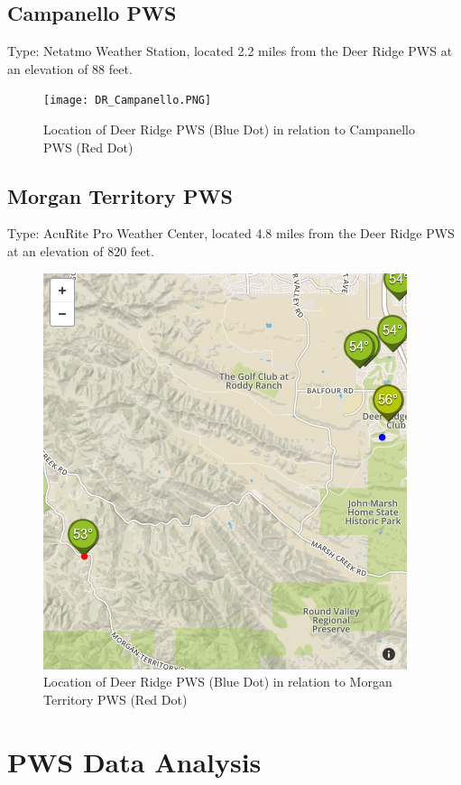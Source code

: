 \documentclass[sigconf]{acmart}
\begin{document}
\subsection{Campanello PWS}

Type: Netatmo Weather Station, located 2.2 miles from the Deer Ridge PWS at an elevation of 88 feet.

\begin{figure}[H]
    \centering
    \texttt{[image: DR\_Campanello.PNG]}
    \caption{Location of Deer Ridge PWS (Blue Dot) in relation to Campanello PWS (Red Dot)}
\end{figure}

\subsection{Morgan Territory PWS} 

Type: AcuRite Pro Weather Center, located 4.8 miles from the Deer Ridge PWS at an elevation of 820 feet.

\begin{figure}[H]
    \centering
    \includegraphics[scale=.40]{DR_MTP.PNG}
    \caption{Location of Deer Ridge PWS (Blue Dot) in relation to Morgan Territory PWS (Red Dot)}
    \end{figure}

\section{PWS Data Analysis}
\end{document}
